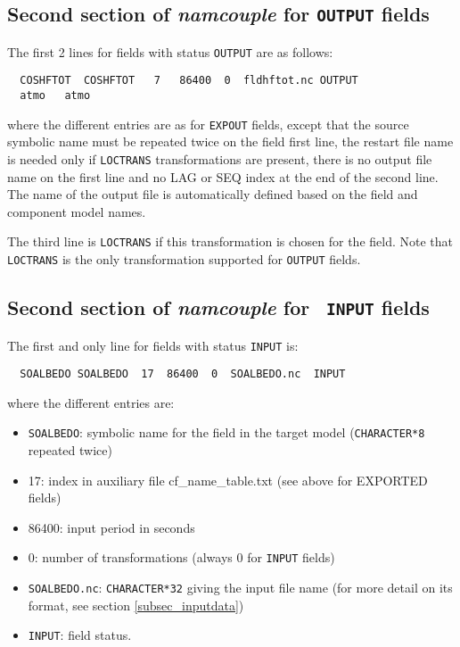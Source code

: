 \subsection{Second section of {\it namcouple} for {\tt OUTPUT} fields}
\label{subsubsec_secondOUTPUT}
  The first 2 lines for fields with status {\tt OUTPUT} are as follows:
  \begin{verbatim}
  COSHFTOT  COSHFTOT   7   86400  0  fldhftot.nc OUTPUT 
  atmo   atmo 
  \end{verbatim}
where the different entries are as for {\tt EXPOUT} fields, except
that the source symbolic name must be repeated twice on the field
first line, the restart file name is needed only if {\tt LOCTRANS}
transformations are present, there is no output file
name on the first line and no LAG or  SEQ index at the end of the second line.
The name of the output file is automatically defined based on the field and component model names.

The third line is {\tt LOCTRANS} if this transformation is chosen for
the field. Note that {\tt LOCTRANS} is the only transformation
supported for {\tt OUTPUT} fields.

\subsection{Second section of {\it namcouple} for {\tt
  INPUT} fields}
\label{subsubsec_secondINPUT}

  The first and only line for fields with status {\tt INPUT} is:

  \begin{verbatim}
  SOALBEDO SOALBEDO  17  86400  0  SOALBEDO.nc  INPUT\end{verbatim} where the different entries are:
  \begin{itemize}
  \item  {\tt SOALBEDO}: symbolic name for the field in the target
  model ({\tt CHARACTER*8} repeated twice)
  \item 17:  index in auxiliary file cf\_name\_table.txt (see above for EXPORTED fields)
  \item 86400: input period in seconds
  \item 0: number of transformations (always 0 for {\tt INPUT} fields)
  \item {\tt SOALBEDO.nc}: {\tt CHARACTER*32} giving the input file
  name (for more detail on its format, see section
  \ref{subsec_inputdata})
  \item {\tt INPUT}: field status.
  \end{itemize}

